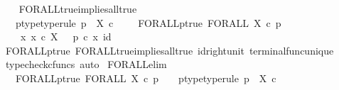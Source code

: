 \begin{isabellebody}
\ \ \isamarkupfalse%
\isanewline
{}\isamarkupfalse%
%
\endisatagproof
{\isafoldproof}%
%
\isadelimproof
\isanewline
%
\endisadelimproof
\isanewline
{}\isamarkupfalse%
\ FORALL{\isacharunderscore}{\kern0pt}true{\isacharunderscore}{\kern0pt}implies{\isacharunderscore}{\kern0pt}all{\isacharunderscore}{\kern0pt}true{}{\isacharcolon}{\kern0pt}\isanewline
\ \ \ p{\isacharunderscore}{\kern0pt}type{\isacharbrackleft}{\kern0pt}type{\isacharunderscore}{\kern0pt}rule{\isacharbrackright}{\kern0pt}{\isacharcolon}{\kern0pt}\ {\isachardoublequoteopen}p\ {\isacharcolon}{\kern0pt}\ X\ {\isasymtimes}\isactrlsub c\ {\isasymone}\ {\isasymrightarrow}\ {\isasymOmega}{\isachardoublequoteclose}\ \ FORALL{\isacharunderscore}{\kern0pt}p{\isacharunderscore}{\kern0pt}true{\isacharcolon}{\kern0pt}\ {\isachardoublequoteopen}FORALL\ X\ {\isasymcirc}\isactrlsub c\ p\isactrlsup {\isasymsharp}\ {\isacharequal}{\kern0pt}\ {\isasymt}{\isachardoublequoteclose}\isanewline
\ \ \ {\isachardoublequoteopen}{\isasymAnd}\ x{\isachardot}{\kern0pt}\ x\ {\isasymin}\isactrlsub c\ X\ \ {\isasymLongrightarrow}\ p\ {\isasymcirc}\isactrlsub c\ {\isasymlangle}x{\isacharcomma}{\kern0pt}\ id\ {\isasymone}{\isasymrangle}\ {\isacharequal}{\kern0pt}\ {\isasymt}{\isachardoublequoteclose}\isanewline
%
\isadelimproof
\ \ %
\endisadelimproof
%
\isatagproof
{}\isamarkupfalse%
\ FORALL{\isacharunderscore}{\kern0pt}p{\isacharunderscore}{\kern0pt}true\ FORALL{\isacharunderscore}{\kern0pt}true{\isacharunderscore}{\kern0pt}implies{\isacharunderscore}{\kern0pt}all{\isacharunderscore}{\kern0pt}true{}\ id{\isacharunderscore}{\kern0pt}right{\isacharunderscore}{\kern0pt}unit{}\ terminal{\isacharunderscore}{\kern0pt}func{\isacharunderscore}{\kern0pt}unique\ \isamarkupfalse%
\ {\isacharparenleft}{\kern0pt}typecheck{\isacharunderscore}{\kern0pt}cfuncs{\isacharcomma}{\kern0pt}\ auto{\isacharparenright}{\kern0pt}%
\endisatagproof
{\isafoldproof}%
%
\isadelimproof
\isanewline
%
\endisadelimproof
\isanewline
{}\isamarkupfalse%
\ FORALL{\isacharunderscore}{\kern0pt}elim{\isacharcolon}{\kern0pt}\isanewline
\ \ \ FORALL{\isacharunderscore}{\kern0pt}p{\isacharunderscore}{\kern0pt}true{\isacharcolon}{\kern0pt}\ {\isachardoublequoteopen}FORALL\ X\ {\isasymcirc}\isactrlsub c\ p\isactrlsup {\isasymsharp}\ {\isacharequal}{\kern0pt}\ {\isasymt}{\isachardoublequoteclose}\ \ p{\isacharunderscore}{\kern0pt}type{\isacharbrackleft}{\kern0pt}type{\isacharunderscore}{\kern0pt}rule{\isacharbrackright}{\kern0pt}{\isacharcolon}{\kern0pt}\ {\isachardoublequoteopen}p\ {\isacharcolon}{\kern0pt}\ X\ {\isasymtimes}\isactrlsub c\ {\isasymone}\ {\isasymrightarrow}\ {\isasymOmega}{\isachardoublequoteclose}\isanewline

\end{isabellebody}
